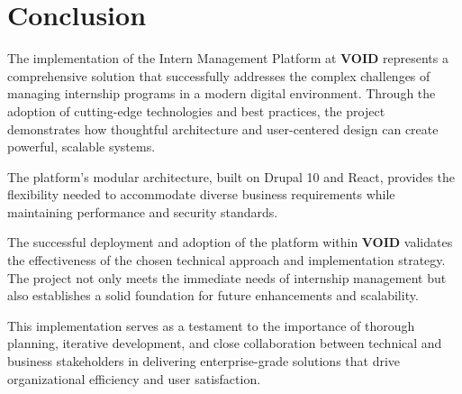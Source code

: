 \section{Conclusion}

The implementation of the Intern Management Platform at \textbf{VOID} represents a comprehensive solution that successfully addresses the complex challenges of managing internship programs in a modern digital environment. Through the adoption of cutting-edge technologies and best practices, the project demonstrates how thoughtful architecture and user-centered design can create powerful, scalable systems.

The platform's modular architecture, built on Drupal 10 and React, provides the flexibility needed to accommodate diverse business requirements while maintaining performance and security standards.

The successful deployment and adoption of the platform within \textbf{VOID} validates the effectiveness of the chosen technical approach and implementation strategy. The project not only meets the immediate needs of internship management but also establishes a solid foundation for future enhancements and scalability.

This implementation serves as a testament to the importance of thorough planning, iterative development, and close collaboration between technical and business stakeholders in delivering enterprise-grade solutions that drive organizational efficiency and user satisfaction.

\bigskip


